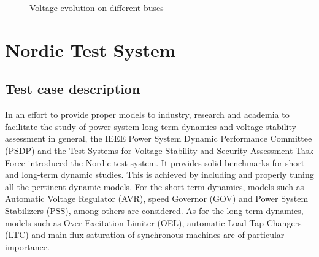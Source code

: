 \documentclass[a4paper, 12pt]{report}
\begin{document}
\begin{figure}[H]
\caption{Voltage evolution on different buses}
\end{figure}

\chapter{Nordic Test System}

\section{Test case description}

In an effort to provide proper models to industry, research and academia to facilitate the study of power system long-term dynamics and voltage stability assessment in general, the IEEE Power System Dynamic Performance Committee (PSDP) and the Test Systems for Voltage Stability and Security Assessment Task Force introduced the Nordic test system. It provides solid benchmarks for short- and long-term dynamic studies. This is achieved by including and properly tuning all the pertinent dynamic models. For the short-term dynamics, models such as Automatic Voltage Regulator (AVR), speed Governor (GOV) and Power System Stabilizers (PSS), among others are considered. As for the long-term dynamics, models such as Over-Excitation Limiter (OEL), automatic Load Tap Changers (LTC) and main flux saturation of synchronous machines are of particular importance.
\end{document}
